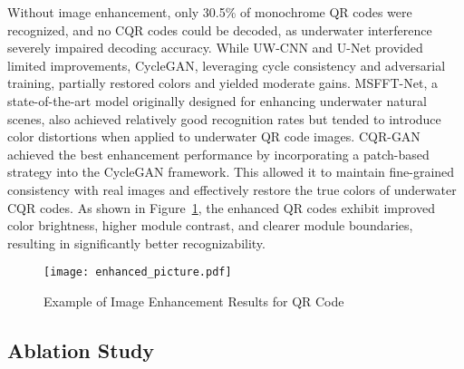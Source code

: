 \documentclass[preprint,12pt]{elsarticle}
\begin{document}

Without image enhancement, only 30.5\% of monochrome QR codes were recognized, and no CQR codes could be decoded, as underwater interference severely impaired decoding accuracy. While UW-CNN and U-Net provided limited improvements, CycleGAN, leveraging cycle consistency and adversarial training, partially restored colors and yielded moderate gains. MSFFT-Net, a state-of-the-art model originally designed for enhancing underwater natural scenes, also achieved relatively good recognition rates but tended to introduce color distortions when applied to underwater QR code images. CQR-GAN achieved the best enhancement performance by incorporating a patch-based strategy into the CycleGAN framework. This allowed it to maintain fine-grained consistency with real images and effectively restore the true colors of underwater CQR codes. As shown in Figure~\ref{fig:enter-label6}, the enhanced QR codes exhibit improved color brightness, higher module contrast, and clearer module boundaries, resulting in significantly better recognizability.

\begin{figure}[H]
\centering
    \texttt{[image: enhanced\_picture.pdf]}
    \caption{Example of Image Enhancement Results for QR Code}
    \label{fig:enter-label6}
\end{figure}


\subsection{Ablation Study}
\end{document}
